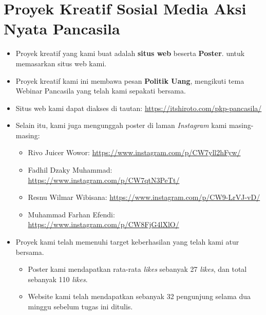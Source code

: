 \documentclass[12pt]{article}
\begin{document}
\section{Proyek Kreatif Sosial Media Aksi Nyata Pancasila}
\begin{itemize}
    \item Proyek kreatif yang kami buat adalah \textbf{situs web} beserta \textbf{Poster}.
          untuk memasarkan situs web kami.
    \item Proyek kreatif kami ini membawa pesan \textbf{Politik Uang}, mengikuti 
          tema Webinar Pancasila yang telah kami sepakati bersama.
    \item Situs web kami dapat diakses di tautan: \url{https://itshiroto.com/pkp-pancasila/}
    \item Selain itu, kami juga mengunggah poster di laman \emph{Instagram} kami 
          masing-masing:
        \begin{itemize}
          \item Rivo Juicer Wowor: \url{https://www.instagram.com/p/CW7yll2hFyw/}
          \item Fadhil Dzaky Muhammad: \url{https://www.instagram.com/p/CW7qtN3PeTt/}
          \item Resnu Wilmar Wibisana: \url{https://www.instagram.com/p/CW9-LrVJ-vD/}
          \item Muhammad Farhan Efendi: \url{https://www.instagram.com/p/CW8FjG4lXlO/}
        \end{itemize}
    \item Proyek kami telah memenuhi target keberhasilan yang telah kami atur bersama.
        \begin{itemize}
          \item Poster kami mendapatkan rata-rata \emph{likes} sebanyak 27 \emph{likes}, dan
                total sebanyak 110 \emph{likes}.
          \item Website kami telah mendapatkan sebanyak 32 pengunjung selama dua
                minggu sebelum tugas ini ditulis.

        \end{itemize}
\end{itemize}
\end{document}
